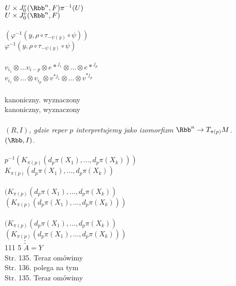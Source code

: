 \documentclass[a4paper,11pt]{article}
\numberwithin{equation}{section}
\begin{document}
 \\
\Jest  $U \times J^{ r }_{ 0 }( \Rbb^{ n }, F ) \pi^{ -1 }( U )$ \\
\Powin $U \times J^{ r }_{ 0 }( \Rbb^{ n }, F )$ \\
 \\
\Jest $( \varphi^{ -1 }( y, \rho \circ \tau_{ -\psi( y ) } \circ \psi ) )$ \\[0.5em]
\Powin $\varphi^{ -1 }( y, \rho \circ \tau_{ -\psi( y ) } \circ \psi )$ \\
 \\
\Jest  $v_{ i_{ 1 } } \otimes \ldots v_{ i - p } \otimes { e* }^{ j_{ 1 } }
\otimes \ldots \otimes { e* }^{ j_{ p } }$ \\[0.3em]
\Powin $v_{ i_{ 1 } } \otimes \ldots \otimes v_{ i_{ p } } \otimes v^{ * j_{ 1 } }
\otimes \ldots \otimes v^{ * j_{ p } }$ \\[0.3em]
 \\
\Jest  kanoniczny. wyznaczony \\
\Powin kanoniczny, wyznaczony \\
 \\
\Jest \textit{$( R, I )$, gdzie reper $p$ interpretujemy jako izomorfizm
  $\Rbb^{ n } \to T_{ \pi( p ) }M$.} \\
\Powin $( \Rbb, I )$. \\
 \\[0.3em]
\Jest  $p^{ -1 }( K_{ \pi( p ) }( d_{ p }\pi( X_{ 1 } ), \ldots,
d_{ p }\pi( X_{ k } ) ) )$ \\[0.5em]
\Powin $K_{ \pi( p ) }( d_{ p }\pi( X_{ 1 } ), \ldots, d_{ p }\pi( X_{ k } ) )$ \\[0.3em]
 \\[0.3em]
\Jest  $( K_{ \pi( p ) }( d_{ p }\pi( X_{ 1 } ), \ldots,
d_{ p }\pi( X_{ k } ) )$ \\[0.3em]
\Powin $( K_{ \pi( p ) }( d_{ p }\pi( X_{ 1 } ), \ldots,
d_{ p }\pi( X_{ k } ) ) )$ \\[0.3em]
 \\[0.3em]
\Jest  $( K_{ \pi( p ) }( d_{ p }\pi( X_{ 1 } ), \ldots,
d_{ p }\pi( X_{ k } ) )$ \\[0.3em]
\Powin $( K_{ \pi( p ) }( d_{ p }\pi( X_{ 1 } ), \ldots,
d_{ p }\pi( X_{ k } ) ) )$ \\


111 5 $\widetilde{ \widetilde{ A } } = Y$ \\
Str. 135. Teraz omówimy \\
Str. 136. polega na tym \\
Str. 135. Teraz omówimy \\
\end{document}
